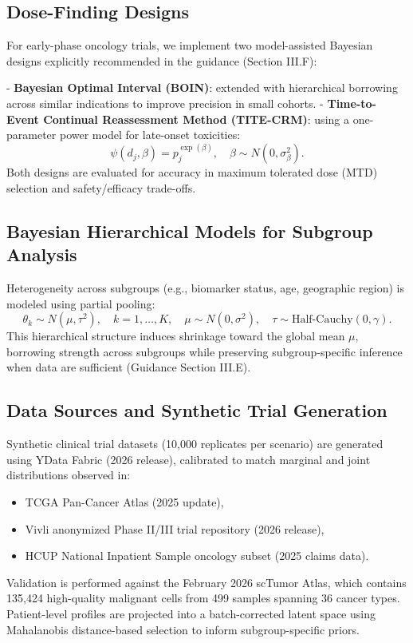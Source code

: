 \documentclass[11pt,a4paper,twoside]{article}
\begin{document}
\subsection{Dose-Finding Designs}
For early-phase oncology trials, we implement two model-assisted Bayesian designs explicitly recommended in the guidance (Section III.F):

- \textbf{Bayesian Optimal Interval (BOIN)}: extended with hierarchical borrowing across similar indications to improve precision in small cohorts.
- \textbf{Time-to-Event Continual Reassessment Method (TITE-CRM)}: using a one-parameter power model for late-onset toxicities:
  \[
  \psi(d_j, \beta) = p_j^{\exp(\beta)}, \quad \beta \sim N(0, \sigma_\beta^2).
  \]
Both designs are evaluated for accuracy in maximum tolerated dose (MTD) selection and safety/efficacy trade-offs.

\subsection{Bayesian Hierarchical Models for Subgroup Analysis}
Heterogeneity across subgroups (e.g., biomarker status, age, geographic region) is modeled using partial pooling:
\[
\theta_k \sim N(\mu, \tau^2), \quad k=1,\dots,K, \quad \mu \sim N(0, \sigma^2), \quad \tau \sim \text{Half-Cauchy}(0, \gamma).
\]
This hierarchical structure induces shrinkage toward the global mean $\mu$, borrowing strength across subgroups while preserving subgroup-specific inference when data are sufficient (Guidance Section III.E).

\subsection{Data Sources and Synthetic Trial Generation}
Synthetic clinical trial datasets (10,000 replicates per scenario) are generated using YData Fabric (2026 release), calibrated to match marginal and joint distributions observed in:
\begin{itemize}
  \item TCGA Pan-Cancer Atlas (2025 update),
  \item Vivli anonymized Phase II/III trial repository (2026 release),
  \item HCUP National Inpatient Sample oncology subset (2025 claims data).
\end{itemize}

Validation is performed against the February 2026 scTumor Atlas, which contains 135,424 high-quality malignant cells from 499 samples spanning 36 cancer types. Patient-level profiles are projected into a batch-corrected latent space using Mahalanobis distance-based selection to inform subgroup-specific priors.
\end{document}
